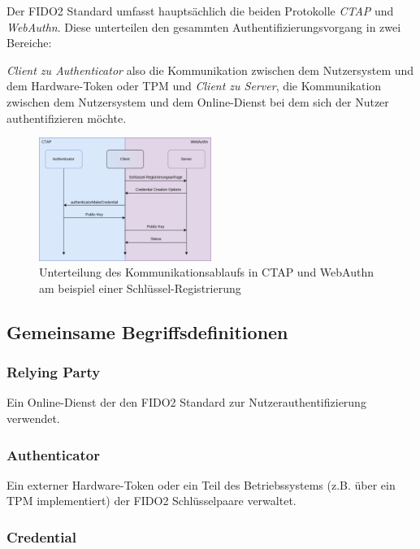 \documentclass[journal]{IEEEtran}
\begin{document}
Der FIDO2 Standard umfasst hauptsächlich die beiden Protokolle \textit{CTAP}
und \textit{WebAuthn}. Diese unterteilen den gesammten
Authentifizierungsvorgang in
zwei Bereiche:

\textit{Client zu Authenticator} also die Kommunikation zwischen dem
Nutzersystem und dem Hardware-Token oder TPM und \textit{Client zu Server}, die
Kommunikation zwischen dem Nutzersystem und dem Online-Dienst bei dem sich der
Nutzer authentifizieren möchte.

\begin{figure}[ht]
	\includegraphics[width=0.5\textwidth]{ctap-webauthn-registration.png}
	\centering
	\caption{Unterteilung des Kommunikationsablaufs in CTAP und WebAuthn am
	beispiel einer Schlüssel-Registrierung}\label{fig:ctap-webauthn}
\end{figure}

\subsection{Gemeinsame Begriffsdefinitionen}

\subsubsection{Relying Party}

Ein Online-Dienst der den FIDO2 Standard zur Nutzerauthentifizierung verwendet.

\subsubsection{Authenticator}

Ein externer Hardware-Token oder ein Teil des Betriebssystems (z.B. über ein
TPM implementiert) der FIDO2 Schlüsselpaare verwaltet.

\subsubsection{Credential}
\end{document}
